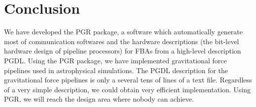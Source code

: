 \documentclass{llncs}
\begin{document}

\section{Conclusion}
We have developed the PGR package, a software which automatically generate
most of communication softwares and the hardware descriptions
(the bit-level hardware design of pipeline processors)
for FBAs from a high-level description PGDL.
Using the PGR package, we have implemented gravitational force
pipelines used in astrophysical simulations.
The PGDL description for the gravitational force pipelines
is only a several tens of lines of a text file.
Regardless of a very simple description, we could obtain very
efficient implementation. 
Using PGR, we will reach the design area where nobody can achieve.
\end{document}
